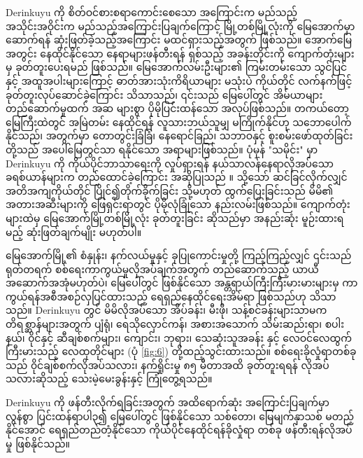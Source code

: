 \documentclass[10pt,twocolumn,letterpaper]{article}
\begin{document}
Derinkuyu ကို စိတ်ဝင်စားစရာကောင်းစေသော အကြောင်းက မည်သည့် အသိုင်းအဝိုင်းက မည်သည့်အကြောင်းပြချက်ကြောင့် မြို့တစ်မြို့လုံးကို မြေအောက်မှာ ဆောက်ရန် ဆုံးဖြတ်ခဲ့သည့်အကြောင်း မထင်ရှားသည့်အတွက် ဖြစ်သည်။ အောက်မြေအတွင်း နေထိုင်နိုင်သော နေရာများဖန်တီးရန် ရှစ်သည့် အခန်းတိုင်းကို ကျောက်တုံးများမှ ခုတ်တူးပေးရမည် ဖြစ်သည်။ မြေအောက်လမ်းဦးများ၏ ကြမ်းတမ်းသော သွင်ပြင်နှင့် အထူအပါးများကြောင့် ဓာတ်အားသုံးကိရိယာများ မသုံးပဲ ကိုယ်တိုင် လက်နက်ဖြင့် ခုတ်တူးလုပ်ဆောင်ခဲ့ကြောင်း သိသာသည်၊ ၎င်းသည် မြေပေါ်တွင် အိမ်ယာများတည်ဆောက်မှုထက် အဆ များစွာ ပိုမိုပြင်းထန်သော အလုပ်ဖြစ်သည်။ တကယ်တော့ မြေကြီးထဲတွင် အမြဲတမ်း နေထိုင်ရန် လူသားဘယ်သူမျှ မကြိုက်နိုင်ဟု သဘောပေါက်နိုင်သည်၊ အတွက်မှာ တောတွင်းခြံခြံ၊ နေရောင်ခြည်၊ သဘာဝနှင့် စူးစမ်းဖော်ထုတ်ခြင်းတို့သည် အပေါ်မြေတွင်သာ ရနိုင်သော အရာများဖြစ်သည်။ ပုံမှန် "သမိုင်း" မှာ Derinkuyu ကို ကိုယ်ပိုင်ဘာသာရေးကို လှုပ်ရှားရန် နယ်သာလန်နေရာလိုအပ်သော ခရစ်ယာန်များက တည်ထောင်ခဲ့ကြောင်း အဆိုပြုသည် \cite{53}။ သို့သော် ဆင်ခြင်လိုက်လျှင် အတိအကျကိုယ်တိုင် ပြိုင်၍တိုက်ခိုက်ခြင်း သို့မဟုတ် ထွက်ပြေးခြင်းသည် မိမိ၏ အတားအဆီးများကို ဖြေရှင်းရာတွင် ပိုမိုလုံခြုံသော နည်းလမ်းဖြစ်သည်။ ကျောက်တုံးများထဲမှ မြေအောက်မြို့တစ်မြို့လုံး ခုတ်တူးခြင်း ဆိုသည်မှာ အနည်းဆုံး မူဉ်းထားရမည့် ဆုံးဖြတ်ချက်မျိုး မဟုတ်ပါ။

မြေအောက်မြို့၏ စံနှုန်း၊ နက်လယ်မှုနှင့် ခုပြုကောင်းမှုတို့ ကြည့်ကြည့်လျှင် ၎င်းသည် ရုတ်တရက် စစ်ရေးကာကွယ်မှုလိုအပ်ချက်အတွက် တည်ဆောက်သည့် ယာယီအဆောက်အအုံမဟုတ်ပဲ၊ မြေပေါ်တွင် ဖြစ်နိုင်သော အန္တရာယ်ကြီးကြီးမားမားများမှ ကာကွယ်ရန်အစီအစဉ်လှပြင်ထားသည့် ရေရှည်နေထိုင်ရေးအိမ်ရာ ဖြစ်သည်ဟု သိသာသည်။ Derinkuyu တွင် မိမိလိုအပ်သော အိပ်ခန်း၊ မီးဖို၊ သန့်စင်ခန်းများသာမက တိရစ္ဆာန်များအတွက် ပျံရုံ၊ ရေသိုလှောင်ကန်၊ အစားအသောက် သိမ်းဆည်းရာ၊ စပါးနယ်၊ ၀ိုင်နှင့် ဆီချစ်စက်များ၊ ကျောင်း၊ ဘုရား၊ သေဆုံးသူအခန်း နှင့် လေဝင်လေထွက်ကြီးမားသည့် လေထုတိုင်များ (ပုံ \ref{fig:6}) တို့ထည့်သွင်းထားသည်။ စစ်ရေးခိုလှုံရာတစ်ခုသည် ၀ိုင်ချစ်စက်လိုအပ်သလား၊ နက်ရှိုင်းမှု ၈၅ မီတာအထိ ခုတ်တူးရရန် လိုအပ်သလားဆိုသည့် သေးမဲ့မေးခွန်းနှင့် ကြုံတွေ့ရသည်။

Derinkuyu ကို ဖန်တီးလိုက်ရခြင်းအတွက် အထိရောက်ဆုံး အကြောင်းပြချက်မှာ လွန်စွာ ပြင်းထန်ရာပါ၃၍ မြေပေါ်တွင် ဖြစ်နိုင်သော သစ်တော၊ မြေမျက်နှာသစ် မတည့်နိုင်အောင် ရေရှည်တည်တံ့နိုင်သော ကိုယ်ပိုင်နေထိုင်ရန်ခိုလှုံရာ တစ်ခု ဖန်တီးရန်လိုအပ်မှု ဖြစ်နိုင်သည်။
\end{document}
